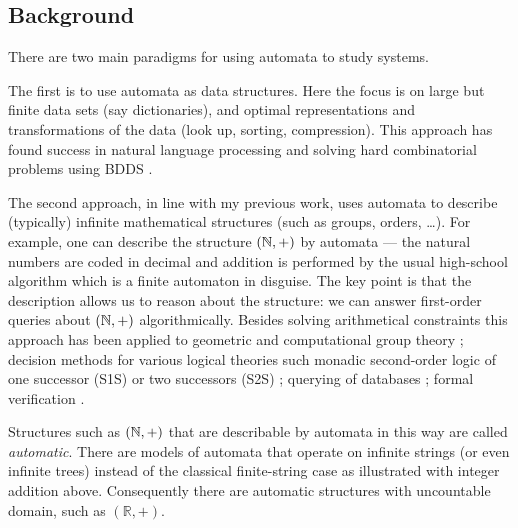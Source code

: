 \documentclass[12pt]{article}
\theoremstyle{plain} \numberwithin{equation}{section}
\theoremstyle{definition}
\def\tit#1{\subsection*{#1}}
\begin{document}

\tit{Background}

There are two main paradigms for using automata to study systems. 

The first is to use automata as data structures. Here the focus is on large but finite data sets (say dictionaries), and optimal representations and transformations of the data (look up, sorting, compression). This approach has found success in natural language processing \cite{mpr07} and solving hard combinatorial problems using BDDS \cite{Brya86}.

The second approach, in line with my previous work, uses automata to describe (typically) infinite mathematical structures (such as groups, orders, \dots). For example, one can describe the structure $({\mathbb N},+)$ by automata --- the natural numbers are coded in decimal and addition is performed by the usual high-school algorithm which is a finite automaton in disguise. The key point is that the description allows us to reason about the structure: we can answer first-order queries about $({\mathbb N},+)$ algorithmically. Besides solving arithmetical constraints  this approach has been applied to
geometric and computational group theory \cite{CEHLPT92}; decision methods for various logical theories such monadic second-order logic of one successor (S1S) or two successors (S2S) \cite{Buch60, Rabi69}; querying of databases \cite{BeLi02}; formal verification \cite{VaWo94} \cite{BRV04}.

Structures such as $({\mathbb N},+)$ that are describable by automata in this way are called {\em automatic}. There are models of automata that operate on infinite strings (or even infinite trees) instead of the classical finite-string case as illustrated with integer addition above. Consequently there are automatic structures with uncountable domain, such as $(\mathbb{R},+)$. 

\end{document}
